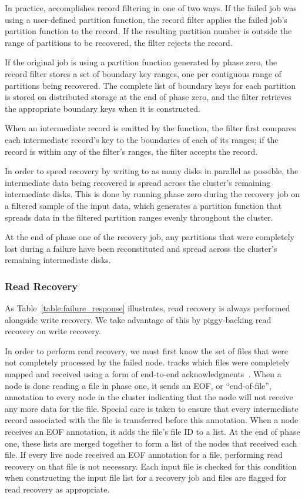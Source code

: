 In practice, \themis accomplishes record filtering in one of two ways. If the
failed job was using a user-defined partition function, the record filter
applies the failed job's partition function to the record. If the resulting
partition number is outside the range of partitions to be recovered, the filter
rejects the record.

If the original job is using a partition function generated by phase zero, the
record filter stores a set of boundary key ranges, one per contiguous range of
partitions being recovered. The complete list of boundary keys for each
partition is stored on distributed storage at the end of phase zero, and the
filter retrieves the appropriate boundary keys when it is constructed.

When an intermediate record is emitted by the \map function, the filter first
compares each intermediate record's key to the boundaries of each of its
ranges; if the record is within any of the filter's ranges, the filter
accepts the record.

In order to speed recovery by writing to as many disks in parallel as possible,
the intermediate data being recovered is spread across the cluster's remaining
intermediate disks. This is done by running phase zero during the recovery job
on a filtered sample of the input data, which generates a partition function
that spreads data in the filtered partition ranges evenly throughout the cluster.

At the end of phase one of the recovery job, any partitions that were
completely lost during a failure have been reconstituted and spread across the
cluster's remaining intermediate disks.

\subsubsection{Read Recovery}

As Table~\ref{table:failure_response} illustrates, read recovery is always
performed alongside write recovery. We take advantage of this by piggy-backing
read recovery on write recovery.

In order to perform read recovery, we must first know the set of files that
were not completely processed by the failed node. \themis tracks which files
were completely mapped and received using a form of end-to-end
acknowledgments~\cite{endtoendargument}.  When a node is done reading a file in
phase one, it sends an EOF, or ``end-of-file'', annotation to every node in the
cluster indicating that the node will not receive any more data for the
file. Special care is taken to ensure that every intermediate record associated
with the file is transferred before this annotation. When a node receives an
EOF annotation, it adds the file's file ID to a list. At the end of phase one,
these lists are merged together to form a list of the nodes that received each
file. If every live node received an EOF annotation for a file, performing read
recovery on that file is not necessary. Each input file is checked for this
condition when constructing the input file list for a recovery job and files
are flagged for read recovery as appropriate.


